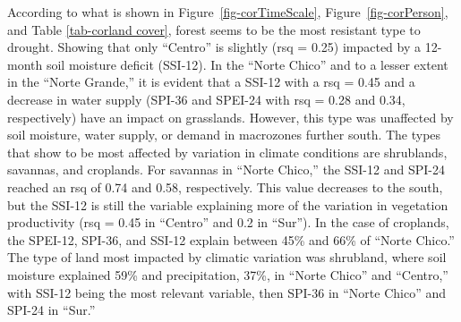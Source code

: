 \documentclass[
  authoryear,
  preprint,
  3p,
  onecolumn]{elsarticle}
\begin{document}
According to what is shown in Figure~\ref{fig-corTimeScale},
Figure~\ref{fig-corPerson}, and Table \ref{tab-corland cover}, forest
seems to be the most resistant type to drought. Showing that only
``Centro'' is slightly (rsq = 0.25) impacted by a 12-month soil moisture
deficit (SSI-12). In the ``Norte Chico'' and to a lesser extent in the
``Norte Grande,'' it is evident that a SSI-12 with a rsq = 0.45 and a
decrease in water supply (SPI-36 and SPEI-24 with rsq = 0.28 and 0.34,
respectively) have an impact on grasslands. However, this type was
unaffected by soil moisture, water supply, or demand in macrozones
further south. The types that show to be most affected by variation in
climate conditions are shrublands, savannas, and croplands. For savannas
in ``Norte Chico,'' the SSI-12 and SPI-24 reached an rsq of 0.74 and
0.58, respectively. This value decreases to the south, but the SSI-12 is
still the variable explaining more of the variation in vegetation
productivity (rsq = 0.45 in ``Centro'' and 0.2 in ``Sur''). In the case
of croplands, the SPEI-12, SPI-36, and SSI-12 explain between 45\% and
66\% of ``Norte Chico.'' The type of land most impacted by climatic
variation was shrubland, where soil moisture explained 59\% and
precipitation, 37\%, in ``Norte Chico'' and ``Centro,'' with SSI-12
being the most relevant variable, then SPI-36 in ``Norte Chico'' and
SPI-24 in ``Sur.''

\newpage

\blandscape
\end{document}
